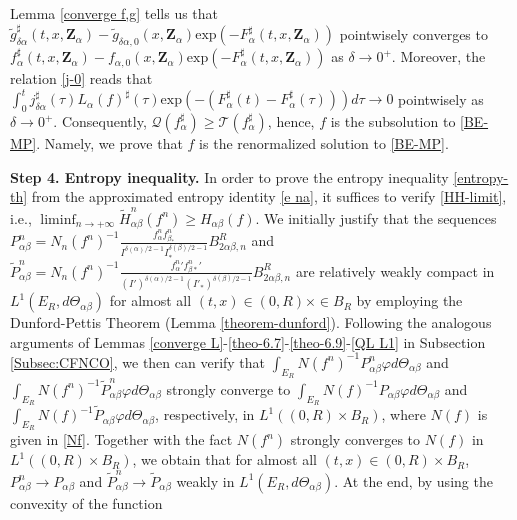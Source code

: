\documentclass[reqno,11pt]{amsart}
\numberwithin{equation}{section}
\def\exp{\mathrm{exp}}
\begin{document}
Lemma \ref{converge f,g} tells us that $ \tilde{g}^{\sharp}_{\delta \alpha } (t,x,\mathbf{Z}_\alpha) -\tilde{g}_{\delta \alpha,0} (x,\mathbf{Z}_\alpha) \exp(-F^\sharp _{\alpha} (t,x,\mathbf{Z}_\alpha)) $ pointwisely converges to $f^{\sharp}_{\alpha } (t,x,\mathbf{Z}_\alpha) - f_{\alpha,0} (x,\mathbf{Z}_\alpha) \exp(-F^\sharp _{\alpha} (t,x,\mathbf{Z}_\alpha))$ as $\delta \to 0^+$. Moreover, the relation \eqref{j-0} reads that $ \int_{0}^{t} j^{\sharp}_{\delta \alpha }(\tau) L_\alpha (f)^\sharp(\tau) \exp(-(F^\sharp _{\alpha } (t)- F^\sharp _{\alpha } (\tau))) d \tau \to 0 $ pointwisely as $\delta \to 0^+$. Consequently, $ \mathcal{Q} (f_\alpha^\sharp) \geq \mathcal{T} (f_\alpha^\sharp) $, hence, $f$ is the subsolution to \eqref{BE-MP}. Namely, we prove that $f$ is the renormalized solution to \eqref{BE-MP}.

{\bf Step 4. Entropy inequality.} In order to prove the entropy inequality \eqref{entropy-th} from the approximated entropy identity \eqref{e na}, it suffices to verify \eqref{HH-limit}, i.e., $ \liminf_{n \to + \infty} \tilde{H}_{\alpha \beta }^n (f^n) \geq H_{\alpha \beta }(f) $. We initially justify that the sequences $ P^n_{\alpha \beta} = N_n (f^n)^{-1} \frac{f^n_\alpha f^n_{\beta_* }}{I^{\delta(\alpha)/2-1} I_* ^{\delta(\beta)/2-1}} B^R_{2 \alpha \beta, n}$ and $ \tilde{P}^n_{\alpha \beta} = N_n (f^n)^{-1} \frac{ {f_\alpha^n}' {f_{\beta *}^n}' }{(I')^{\delta(\alpha)/2-1} (I'_* )^{\delta(\beta)/2-1}} B^R_{2 \alpha \beta, n}$ are relatively weakly compact in $L^1(E_R,d \Theta_{\alpha \beta} )$ for almost all $(t,x) \in (0,R) \times \in B_R$ by employing the Dunford-Pettis Theorem (Lemma \ref{theorem-dunford}). Following the analogous arguments of Lemmas \ref{converge L}-\ref{theo-6.7}-\ref{theo-6.9}-\ref{QL L1} in Subsection \ref{Subsec:CFNCO}, we then can verify that $ \int_{E_R} N (f^n)^{-1} P^n_{\alpha \beta}\varphi d \Theta_{\alpha \beta} $ and $ \int_{E_R} N (f^n)^{-1} \tilde{P}^n_{\alpha \beta}\varphi d\Theta_{\alpha \beta} $ strongly converge to $ \int_{E_R} N (f)^{-1} P_{\alpha \beta}\varphi d \Theta_{\alpha \beta} $ and $ \int_{E_R} N (f)^{-1} \tilde{P}_{\alpha \beta}\varphi d \Theta_{\alpha \beta} $, respectively, in $ L^1((0,R)\times B_R) $, where $ N (f) $ is given in \eqref{Nf}. Together with the fact $N (f^n)$ strongly converges to $N (f)$ in $ L^1((0,R)\times B_R) $, we obtain that for almost all $(t,x)\in (0,R)\times B_R$, $P^n_{\alpha \beta} \rightarrow P_{\alpha \beta}$ and $\tilde{P}^n_{\alpha \beta} \rightarrow \tilde{P}_{\alpha \beta}$ weakly in $ L^1(E_R, d \Theta_{\alpha \beta})$. At the end, by using the convexity of the function
\end{document}
